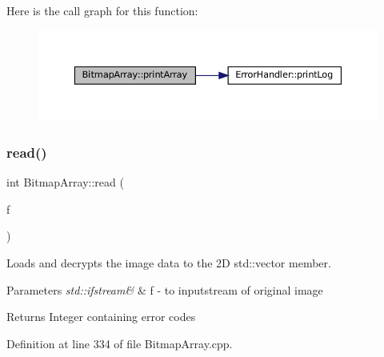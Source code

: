 Here is the call graph for this function\+:\nopagebreak
\begin{figure}[H]
\begin{center}
\leavevmode
\includegraphics[width=350pt]{classBitmapArray_a99a8a164e51e29407f24dab4752232c1_cgraph}
\end{center}
\end{figure}
\mbox{\label{classBitmapArray_a3a5834d03cd095769b422d4d66b9435f}} 
\subsubsection{\texorpdfstring{read()}{read()}}
{\footnotesize\ttfamily int Bitmap\+Array\+::read (\begin{DoxyParamCaption}\item[{std\+::ifstream \&}]{f }\end{DoxyParamCaption})\hspace{0.3cm}{\ttfamily [private]}}



Loads and decrypts the image data to the 2D std\+::vector member. 


\begin{DoxyParams}{Parameters}
{\em std\+::ifstream\&} & f -\/ to inputstream of original image \\
\hline
\end{DoxyParams}
\begin{DoxyReturn}{Returns}
Integer containing error codes 
\end{DoxyReturn}


Definition at line 334 of file Bitmap\+Array.\+cpp.

